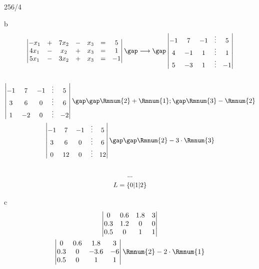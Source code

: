 \begin{exercise}{256/4}
  \item [b]
  \begin{gather*}
    \begin{vmatrix}
      -x_1 & + & 7x_2 & - & x_3 & = & 5 \\
      4x_1 & - & x_2 & + & x_3 & = & 1 \\
      5x_1 & - & 3x_2 & + & x_3 & = & -1
    \end{vmatrix} \gap\longrightarrow\gap
    \begin{vmatrix}
      -1 & 7 & -1 & \vdots & 5 \\
      4 & -1 & 1 & \vdots & 1 \\
      5 & -3 & 1 & \vdots & -1
    \end{vmatrix} \\\\
    \begin{vmatrix}
      -1 & 7 & -1 & \vdots & 5 \\
      3 & 6 & 0 & \vdots & 6 \\
      1 & -2 & 0 & \vdots & -2
    \end{vmatrix} \gap\gap \Rmnum{2} + \Rmnum{1}; \gap \Rmnum{3} - \Rmnum{2} \\
    \begin{vmatrix}
      -1 & 7 & -1 & \vdots & 5 \\
      3 & 6 & 0 & \vdots & 6 \\
      0 & 12 & 0 & \vdots & 12
    \end{vmatrix} \gap\gap \Rmnum{2} - 3 \cdot \Rmnum{3} \\\\
    ... \\
    L = \{0|1|2\}
  \end{gather*}
  \item [c]
  \begin{gather*}
    \begin{vmatrix}
      0 & 0.6 & 1.8 & 3 \\
      0.3 & 1.2 & 0 & 0 \\
      0.5 & 0 & 1 & 1
    \end{vmatrix} \\
    \begin{vmatrix}
      0 & 0.6 & 1.8 & 3 \\
      0.3 & 0 & -3.6 & -6 \\
      0.5 & 0 & 1 & 1 \\
    \end{vmatrix} \Rmnum{2} - 2 \cdot \Rmnum{1} \\

\end{gather*}
\end{exercise}
